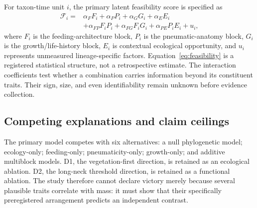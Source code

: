 \documentclass[conference]{IEEEtran}
\begin{document}
For taxon-time unit $i$, the primary latent feasibility score is specified as
\begin{equation}
\begin{aligned}
\mathcal{F}_{i}={}&\alpha_{F}F_{i}+\alpha_{P}P_{i}+\alpha_{G}G_{i}+\alpha_{E}E_{i}\\
&+\alpha_{FP}F_{i}P_{i}+\alpha_{FG}F_{i}G_{i}+\alpha_{PE}P_{i}E_{i}+u_{i},
\end{aligned}
\label{eq:feasibility}
\end{equation}
where $F_i$ is the feeding-architecture block, $P_i$ is the pneumatic-anatomy block, $G_i$ is the growth/life-history block, $E_i$ is contextual ecological opportunity, and $u_i$ represents unmeasured lineage-specific factors. Equation~\eqref{eq:feasibility} is a registered statistical structure, not a retrospective estimate. The interaction coefficients test whether a combination carries information beyond its constituent traits. Their sign, size, and even identifiability remain unknown before evidence collection.

\subsection{Competing explanations and claim ceilings}

The primary model competes with six alternatives: a null phylogenetic model; ecology-only; feeding-only; pneumaticity-only; growth-only; and additive multiblock models. D1, the vegetation-first direction, is retained as an ecological ablation. D2, the long-neck threshold direction, is retained as a functional ablation. The study therefore cannot declare victory merely because several plausible traits correlate with mass: it must show that their specifically preregistered arrangement predicts an independent contrast.
\end{document}
